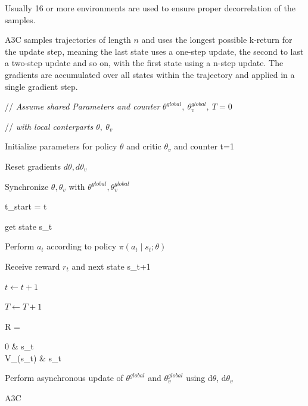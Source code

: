 Usually 16 or more environments are used to ensure proper decorrelation of the samples.

\pagebreak
A3C samples trajectories of length $n$ and uses the longest possible k-return for the update step, meaning the last state uses a one-step update, the second to last a two-step update and so on, with the first state using a n-step update.
The gradients are accumulated over all states within the trajectory and applied in a single gradient step. 

\begin{algorithm}[t]
// \textit{ Assume shared Parameters and counter} $ \theta^{global} ,\ \theta^{global}_v,\ T = 0 $

// \textit{ with local conterparts $\theta,\ \theta_v$}

 Initialize parameters for policy $\theta$ and critic $\theta_v$ and counter t=1
 
 { 
 Reset gradients $d\theta, d\theta_v$
 
 Synchronize $ \theta, \theta_v$ with $\theta^{global} ,\theta^{global}_v$
 
 t_{start} = t
 
 get state s_t

 {
 
 \State Perform $a_t$ according to policy $\pi (a_t \mid s_t;\theta)$
 
 Receive reward $r_t$ and next state s_{t+1}
 
 $t \gets t + 1$
 
 $T \gets T + 1$

 }
 R = \begin{cases} 
 0 &  s_t  \\
 V_{\theta}(s_t) & s_t 
 \end{cases} %
 
 Perform asynchronous update of $\theta^{global}$ and $\theta^{global}_v$ using d$\theta$, d$\theta_v$
 }

 \caption{A3C \citep{A3C}}
\end{algorithm}
